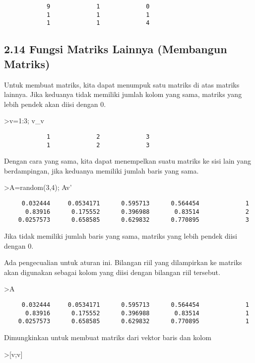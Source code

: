 \documentclass[
]{book}
\begin{document}
\begin{verbatim}
            9             1             0 
            1             1             1 
            1             1             4 
\end{verbatim}

\subsection{2.14 Fungsi Matriks Lainnya (Membangun Matriks)}\label{fungsi-matriks-lainnya-membangun-matriks}

Untuk membuat matriks, kita dapat menumpuk satu matriks di atas matriks lainnya. Jika keduanya tidak memiliki jumlah kolom yang sama, matriks yang lebih pendek akan diisi dengan 0.

\textgreater v=1:3; v\_v

\begin{verbatim}
            1             2             3 
            1             2             3 
\end{verbatim}

Dengan cara yang sama, kita dapat menempelkan suatu matriks ke sisi lain yang berdampingan, jika keduanya memiliki jumlah baris yang sama.

\textgreater A=random(3,4); A\textbar v'

\begin{verbatim}
     0.032444     0.0534171      0.595713      0.564454             1 
      0.83916      0.175552      0.396988       0.83514             2 
    0.0257573      0.658585      0.629832      0.770895             3 
\end{verbatim}

Jika tidak memiliki jumlah baris yang sama, matriks yang lebih pendek diisi dengan 0.

Ada pengecualian untuk aturan ini. Bilangan riil yang dilampirkan ke matriks akan digunakan sebagai kolom yang diisi dengan bilangan riil tersebut.

\textgreater A

\begin{verbatim}
     0.032444     0.0534171      0.595713      0.564454             1 
      0.83916      0.175552      0.396988       0.83514             1 
    0.0257573      0.658585      0.629832      0.770895             1 
\end{verbatim}

Dimungkinkan untuk membuat matriks dari vektor baris dan kolom

\textgreater{[}v;v{]}
\end{document}
